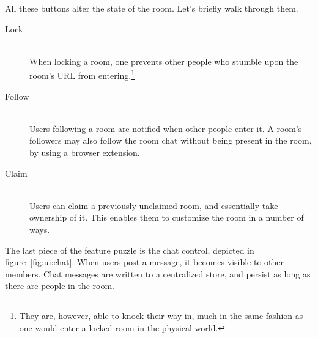     All these buttons alter the state of the room. Let's briefly walk through them.

    \begin{description}
      \item[Lock] \hfill \\
        When locking a room, one prevents other people who stumble upon the room's URL from entering.\footnote{They are, however, able to knock their way in, much in the same fashion as one would enter a locked room in the physical world.}
      \item[Follow] \hfill \\
        Users following a room are notified when other people enter it. A room's followers may also follow the room chat without being present in the room, by using a browser extension.
      \item[Claim] \hfill \\
        Users can claim a previously unclaimed room, and essentially take ownership of it. This enables them to customize the room in a number of ways.
    \end{description}

    The last piece of the feature puzzle is the chat control, depicted in figure~\ref{fig:ui:chat}. When users post a message, it becomes visible to other members. Chat messages are written to a centralized store, and persist as long as there are people in the room.

